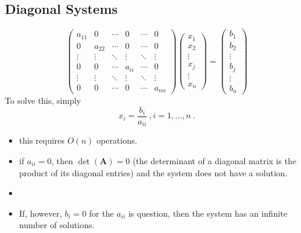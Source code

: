 \documentclass[12pt, answers]{exam}
\newcommand{\ve}[1]{\ensuremath{\mathbf{#1}}}
\begin{document}
\subsection*{Diagonal Systems}
\begin{equation}
   \begin{pmatrix}
      a_{11} & 0      & \cdots & 0      & \cdots & 0 \\
      0      & a_{22} & \cdots & 0      & \cdots & 0 \\
      \vdots & \vdots & \ddots & \vdots & \ddots & \vdots \\     
      0      & 0      & \cdots & a_{ii} & \cdots & 0 \\
      \vdots & \vdots & \ddots & \vdots & \ddots & \vdots \\
      0      & 0      & \cdots & 0      & \cdots & a_{nn} 
    \end{pmatrix} 
    \begin{pmatrix} x_1 \\ x_2 \\ \vdots \\ x_j \\ \vdots \\ x_n \end{pmatrix} =
    \begin{pmatrix} b_1 \\ b_2 \\ \vdots \\ b_j \\ \vdots \\ b_n \end{pmatrix}
    \nonumber   
\end{equation} 
%
To solve this, simply
%
\[x_i = \frac{b_i}{a_{ii}} \:, i=1,\dots,n\:.\]
%
\begin{itemize}
\item this requires $O(n)$ operations.
\ifprintanswers
\item if $a_{ii}=0$, then $\det(\ve{A})=0$ (the determinant of a diagonal matrix is the product of its diagonal entries) and the system does not have a solution.
  \else
  \item
  \fi
\item If, however, $b_i = 0$ for the $a_{ii}$ is question, then the system has an infinite number of solutions.
\end{itemize}

\end{document}
